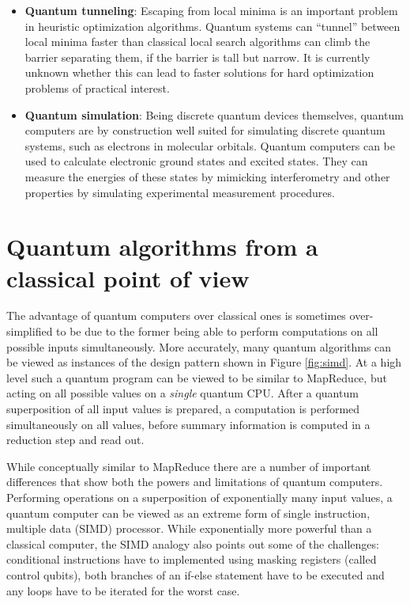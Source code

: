 \documentclass[journal]{IEEEtran}
\begin{document}
\begin{itemize}
\item   {\bf Quantum tunneling}: Escaping from local minima is an important problem in heuristic optimization algorithms. Quantum systems can ``tunnel'' between local minima faster than classical local search algorithms can climb the barrier separating them, if the barrier is tall but narrow. It is currently unknown whether this can lead to faster solutions for hard optimization problems of practical interest.

\item   {\bf Quantum simulation}: Being discrete quantum devices themselves, quantum computers are by construction well suited for simulating discrete quantum systems, such as electrons in molecular orbitals. %
Quantum computers can be used to calculate electronic ground states and excited states. They can measure the energies of these states by mimicking interferometry and other properties by simulating experimental measurement procedures.


\end{itemize}

\section{Quantum algorithms from a classical point of view}
\label{sec:box3}


The advantage of quantum computers over classical ones is sometimes over-simplified to be due to the former being able to perform computations on all possible inputs simultaneously. More accurately, many quantum algorithms can be viewed as instances of the design pattern shown in Figure \ref{fig:simd}. At a high level such a quantum program can be viewed to be similar to MapReduce, but acting on all possible values on a {\em single} quantum CPU. After a quantum superposition of all input values is prepared, a computation is performed simultaneously on all values, before summary information is computed in a reduction step and read out. 

While conceptually similar to MapReduce there are a number of important differences that show both the powers and limitations of quantum computers. Performing operations on a superposition of exponentially many input values, a quantum computer can be viewed as an extreme form of single instruction, multiple data (SIMD) processor. While exponentially more powerful than a classical computer, the SIMD analogy also points out some of the challenges: conditional instructions have to implemented using masking registers (called control qubits), both branches of an if-else statement have to be executed and any loops have to be iterated for the worst case.
\end{document}
